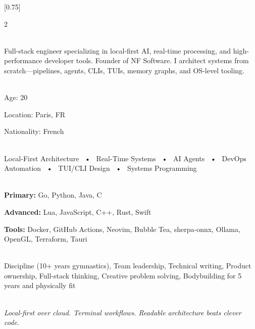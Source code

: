 \documentclass[lighthipster]{simplehipstercv}
\begin{document}
\setlength{\columnsep}{1.5cm}
[0.75]
\begin{paracol}{2}

\paracolbackgroundoptions

\footnotesize
{\setasidefontcolour
\flushleft

\vspace{1em}

\\[0.5em]

{\footnotesize
Full-stack engineer specializing in local-first AI, real-time processing, and high-performance developer tools. Founder of NF Software. I architect systems from scratch—pipelines, agents, CLIs, TUIs, memory graphs, and OS-level tooling.}
\bigskip

 \\[0.5em]
Age: 20

Location: Paris, FR

Nationality: French

\bigskip

 \\[0.5em]

Local-First Architecture ~•~
Real-Time Systems ~•~
AI Agents ~•~
DevOps Automation ~•~
TUI/CLI Design ~•~
Systems Programming

\bigskip

\\[0.5em]

\textbf{Primary:}
Go, Python, Java, C

\textbf{Advanced:}
Lua, JavaScript, C++, Rust, Swift

\textbf{Tools:}
Docker, GitHub Actions, Neovim, Bubble Tea, sherpa-onnx, Ollama, OpenGL, Terraform, Tauri

\bigskip

\\[0.5em]

Discipline (10+ years gymnastics), Team leadership, Technical writing, Product ownership, Full-stack thinking, Creative problem solving, Bodybuilding for 5 years and physically fit

\bigskip

\\[0.5em]

{\footnotesize\textit{Local-first over cloud. Terminal workflows. Readable architecture beats clever code.}}

}
\end{paracol}
\end{document}
